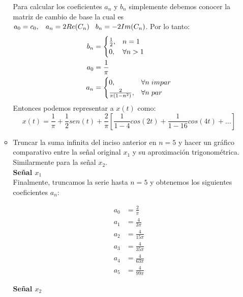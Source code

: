 \documentclass[12pt,a4paper]{report}
\begin{document}
\begin{enumerate}[label=\alph*),left=0pt]
\begin{itemize}[left=0pt]
        Para calcular los coeficientes $a_n$ y $b_n$ simplemente debemos conocer la matriz de cambio de base la cual es $a_0=c_0,\hspace{0.3cm}a_n=2Re(C_n)\hspace{0.3cm}b_n=-2Im(C_n)$.
        Por lo tanto:
        $$
        \begin{aligned}
            b_n&=\begin{cases}
            \frac{1}{2},& n=1\\
            0, & \forall n >1
        \end{cases}\\
        a_0&=\frac{1}{\pi}\\
        a_n&=\begin{cases}
            0,&\forall n \hspace{0.1cm}impar\\
            \frac{2}{\pi(1-n^2)},& \forall n \hspace{0.1cm} par
        \end{cases}\\  
        \end{aligned}
        $$
        Entonces podemos representar a $x(t)$ como:
        $$
        x(t)=\frac{1}{\pi}+\frac{1}{2}sen(t)+\frac{2}{\pi}[\frac{1}{1-4}cos(2t)+\frac{1}{1-16}cos(4t)+\dots]
        $$


   \item Truncar la suma infinita del inciso anterior en $n = 5$ y hacer un gráfico comparativo entre la señal 
     original $x_1$ y su aproximación trigonométrica. Similarmente para la señal $x_2$.\\

\textbf{Señal $x_1$}\\
     Finalmente, truncamos la serie hasta \(n = 5\) y obtenemos los siguientes coeficientes \(a_n\):
  
     $$
     \begin{aligned}
       a_0 &= \frac{2}{\pi} \\
       a_1 &= \frac{4}{3\pi} \\
       a_2 &= \frac{4}{15\pi} \\
       a_3 &= \frac{4}{35\pi} \\
       a_4 &= \frac{4}{63\pi} \\
       a_5 &= \frac{4}{99\pi}
     \end{aligned}
     $$

\textbf{Señal $x_2$}\\


\end{itemize}
\end{enumerate}
\end{document}
